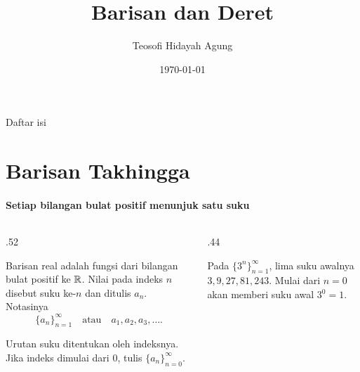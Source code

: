 \documentclass{../../kalkulus-ppt}
\author[Tetew]{Teosofi Hidayah Agung}
\date{\today}
\title[Kalkulus 2 - Bab 6]{Barisan dan Deret}
\institute[Matematika ITS]{Departemen Matematika\\ Institut Teknologi Sepuluh Nopember}
\begin{document}
\begin{frame}
    \titlepage
\end{frame}

\begin{frame}{Daftar isi}
    \tableofcontents
\end{frame}

\section{Barisan Takhingga}

\begin{frame}{\insertsection}
    \framesubtitle{Setiap bilangan bulat positif menunjuk satu suku}
    \begin{columns}[c,onlytextwidth]
        \begin{column}{.52\textwidth}
            \begin{definisi}
                Barisan real adalah fungsi dari bilangan bulat
                positif ke $\mathbb{R}$. Nilai pada indeks $n$ disebut suku
                ke-$n$ dan ditulis $a_n$. Notasinya
                \[
                    \{a_n\}_{n=1}^{\infty}
                    \quad\text{atau}\quad a_1,a_2,a_3,\ldots.
                \]
            \end{definisi}
            Urutan suku ditentukan oleh indeksnya. Jika indeks
            dimulai dari $0$, tulis $\{a_n\}_{n=0}^{\infty}$.
        \end{column}
        \begin{column}{.44\textwidth}
            \begin{contoh}
                Pada $\{3^n\}_{n=1}^{\infty}$, lima suku awalnya
                $3,9,27,81,243$. Mulai dari $n=0$ akan memberi
                suku awal $3^0=1$.
            \end{contoh}
        \end{column}
    \end{columns}
\end{frame}
\end{document}
